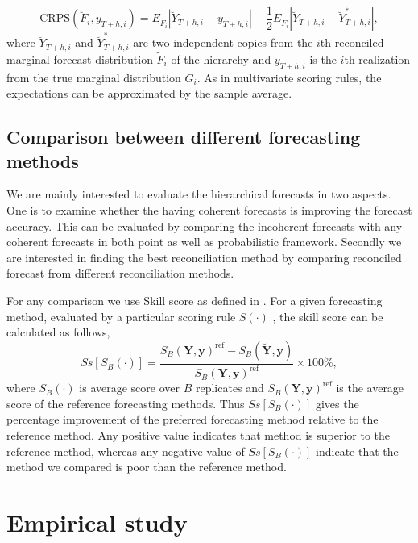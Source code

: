 \documentclass[graybox]{svmult}
\begin{document}
\begin{equation} \label{eq:24}
\text{CRPS}(\breve{F}_i,y_{T+h,i}) = E_{\breve{F}_i}|\breve{Y}_{T+h,i}-y_{T+h,i}| - \frac{1}{2}E_{\breve{F}_i}|\breve{Y}_{T+h,i}-\breve{Y}^*_{T+h,i}|,
\end{equation}
where $\breve{Y}_{T+h,i}$ and $\breve{Y}^*_{T+h,i}$ are two independent copies from the $i$th reconciled marginal forecast distribution $\tilde{F}_i$ of the hierarchy and $y_{T+h,i}$ is the $i$th realization from the true marginal distribution $G_i$. As in multivariate scoring rules, the expectations can be approximated by the sample average.

\subsection{Comparison between different forecasting methods}

We are mainly interested to evaluate the hierarchical forecasts in two aspects. One is to examine whether the having coherent forecasts is improving the forecast accuracy. This can be evaluated by comparing the incoherent forecasts with any coherent forecasts in both point as well as probabilistic framework. Secondly we are interested in finding the best reconciliation method by comparing reconciled forecast from different reconciliation methods.

For any comparison we use Skill score as defined in \citep{Gneiting2007}. For a given forecasting method, evaluated by a particular scoring rule $S(\cdot)$ , the skill score can be calculated as follows,
\begin{equation} \label{eq:25}
Ss[S_B(\cdot)] = \frac{S_B(\bm{Y},\bm{y})^{\text{ref}} - S_B(\breve{\bm{Y}},\bm{y})}{S_B(\bm{Y},\bm{y})^{\text{ref}}}\times 100\%,
\end{equation}
where $S_B(\cdot)$ is average score over $B$ replicates and $S_B(\bm{Y},\bm{y})^{\text{ref}}$ is the average score of the reference forecasting methods. Thus $Ss[S_B(\cdot)]$ gives the percentage improvement of the preferred forecasting method relative to the reference method. Any positive value indicates that method is superior to the reference method, whereas any negative value of $Ss[S_B(\cdot)]$ indicate that the method we compared is poor than the reference method.

\section{Empirical study}
\end{document}
